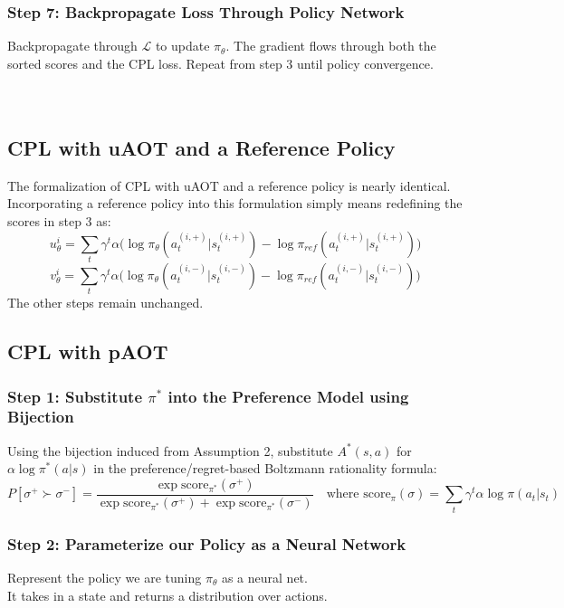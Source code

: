 \documentclass[11pt]{article}
\begin{document}
\subsubsection*{Step 7: Backpropagate Loss Through Policy Network}
Backpropagate through $\mathcal{L}$ to update $\pi_\theta$. The gradient flows through both the sorted scores and the CPL loss. Repeat from step 3 until policy convergence.\\ \\ \\


\subsection{CPL with uAOT and a Reference Policy}

The formalization of CPL with uAOT and a reference policy is nearly identical. Incorporating a reference policy into this formulation simply means redefining the scores in step 3 as:
$$u_\theta^i = \sum_{t}\gamma^t \alpha \big(\log \pi_\theta(a_t^{(i,+)}|s_t^{(i,+)}) - \log \pi_{ref}(a_t^{(i,+)}|s_t^{(i,+)})\big)$$
$$v_\theta^i = \sum_{t}\gamma^t \alpha \big(\log \pi_\theta(a_t^{(i,-)}|s_t^{(i,-)}) - \log \pi_{ref}(a_t^{(i,-)}|s_t^{(i,-)})\big)$$
The other steps remain unchanged.



\newpage
\subsection{CPL with pAOT}

\subsubsection*{Step 1: Substitute $\pi^*$ into the Preference Model using Bijection}
Using the bijection induced from Assumption 2, substitute $A^*(s, a)$ for $\alpha \log \pi^*(a|s)$ in the preference/regret-based Boltzmann rationality formula:
$$P[\sigma^+ \succ \sigma^-] = \frac{\exp \text{score}_{\pi^*}(\sigma^+)}{\exp \text{score}_{\pi^*}(\sigma^+) + \exp \text{score}_{\pi^*}(\sigma^-)} \quad \text{where } \text{score}_\pi(\sigma) = \sum_t \gamma^t \alpha \log \pi(a_t|s_t)$$

\subsubsection*{Step 2: Parameterize our Policy as a Neural Network}
Represent the policy we are tuning $\pi_\theta$ as a neural net.\\
It takes in a state and returns a distribution over actions.
\end{document}
